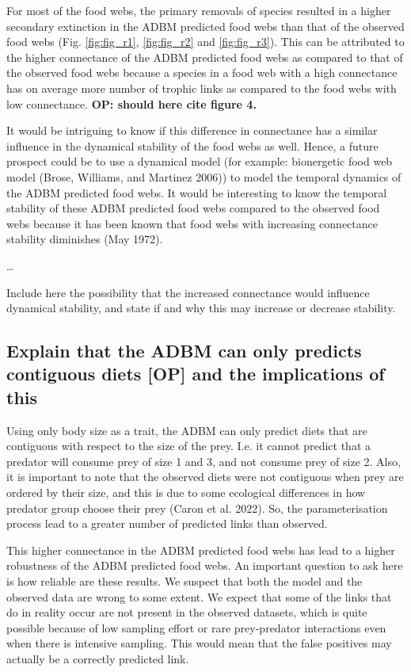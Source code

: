 \documentclass{article}
\begin{document}
For most of the food webs, the primary removals of species resulted in a
higher secondary extinction in the ADBM predicted food webs than that of
the observed food webs (Fig. \ref{fig:fig_r1}, \ref{fig:fig_r2} and
\ref{fig:fig_r3}). This can be attributed to the higher connectance of
the ADBM predicted food webs as compared to that of the observed food
webs because a species in a food web with a high connectance has on
average more number of trophic links as compared to the food webs with
low connectance. \textbf{OP: should here cite figure 4.}

It would be intriguing to know if this difference in connectance has a
similar influence in the dynamical stability of the food webs as well.
Hence, a future prospect could be to use a dynamical model (for example:
bionergetic food web model (Brose, Williams, and Martinez 2006)) to
model the temporal dynamics of the ADBM predicted food webs. It would be
interesting to know the temporal stability of these ADBM predicted food
webs compared to the observed food webs because it has been known that
food webs with increasing connectance stability diminishes (May 1972).

\ldots{}

Include here the possibility that the increased connectance would
influence dynamical stability, and state if and why this may increase or
decrease stability.

\hypertarget{explain-that-the-adbm-can-only-predicts-contiguous-diets-op-and-the-implications-of-this}{%
\subsection{Explain that the ADBM can only predicts contiguous diets
{[}OP{]} and the implications of
this}\label{explain-that-the-adbm-can-only-predicts-contiguous-diets-op-and-the-implications-of-this}}

Using only body size as a trait, the ADBM can only predict diets that
are contiguous with respect to the size of the prey. I.e. it cannot
predict that a predator will consume prey of size 1 and 3, and not
consume prey of size 2. Also, it is important to note that the observed
diets were not contiguous when prey are ordered by their size, and this
is due to some ecological differences in how predator group choose their
prey (Caron et al. 2022). So, the parameterisation process lead to a
greater number of predicted links than observed.

This higher connectance in the ADBM predicted food webs has lead to a
higher robustness of the ADBM predicted food webs. An important question
to ask here is how reliable are these results. We suspect that both the
model and the observed data are wrong to some extent. We expect that
some of the links that do in reality occur are not present in the
observed datasets, which is quite possible because of low sampling
effort or rare prey-predator interactions even when there is intensive
sampling. This would mean that the false positives may actually be a
correctly predicted link.
\end{document}
